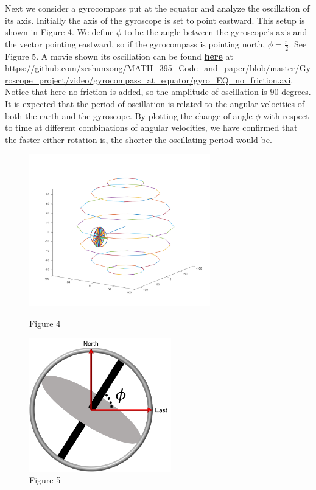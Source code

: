\documentclass[12pt]{article}
\renewcommand{\(}{\left (}
\renewcommand{\)}{\right )}
\begin{document}
Next we consider a gyrocompass put at the equator and analyze the oscillation of its axis. Initially the axis of the gyroscope is set to point eastward. This setup is shown in Figure 4. We define $\phi$ to be the angle between the gyroscope's axis and the vector pointing eastward, so if the gyrocompass is pointing north, $\phi = \frac{\pi}{2}.$ See Figure 5. A movie shown its oscillation can be found \href{https://github.com/zeshunzong/MATH_395_Code_and_paper/blob/master/Gyroscope_project/video/gyrocompass_at_equator/gyro_EQ_no_friction.avi}{\textbf{here}} at \url{https://github.com/zeshunzong/MATH_395_Code_and_paper/blob/master/Gyroscope_project/video/gyrocompass_at_equator/gyro_EQ_no_friction.avi}. Notice that here no friction is added, so the amplitude of oscillation is 90 degrees. It is expected that the period of oscillation is related to the angular velocities of both the earth and the gyroscope. By plotting the change of angle $\phi$ with respect to time at different combinations of angular velocities, we have confirmed that the faster either rotation is, the shorter the oscillating period would be.
\begin{figure}[ht]
	\begin{minipage}{0.5\textwidth}
		\centering
		\includegraphics[width=0.7\textwidth]{gyrocompass_at_equator.png}
		\caption*{\small Figure 4}
	\end{minipage}
	\begin{minipage}{0.5\textwidth}
		\centering
		\includegraphics[width=0.55\textwidth]{define_phi.png}
		\caption*{\small Figure 5}
	\end{minipage}
\end{figure}
\end{document}
